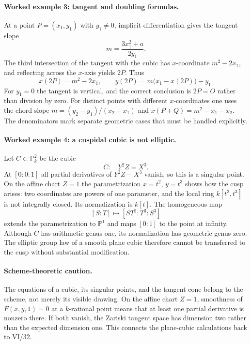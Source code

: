 \paragraph{Worked example 3: tangent and doubling formulas.}
At a point $P=(x_1,y_1)$ with $y_1\ne0$, implicit
differentiation gives the tangent slope
\[
 m=\frac{3x_1^2+a}{2y_1}.
\]
The third intersection of the tangent with the cubic has
$x$-coordinate $m^2-2x_1$, and reflecting across the $x$-axis
yields $2P$.  Thus
\[
 x(2P)=m^2-2x_1,\qquad
 y(2P)=m\bigl(x_1-x(2P)\bigr)-y_1.
\]
For $y_1=0$ the tangent is vertical, and the correct conclusion
is $2P=O$ rather than division by zero.  For distinct points
with different $x$-coordinates one uses the chord slope
$m=(y_2-y_1)/(x_2-x_1)$ and
$x(P+Q)=m^2-x_1-x_2$.  The denominators mark separate
geometric cases that must be handled explicitly.

\paragraph{Worked example 4: a cuspidal cubic is not elliptic.}
Let $C\subset\mathbb P^2_k$ be the cubic
\[
 C:\quad Y^2Z=X^3.
\]
At $[0:0:1]$ all partial derivatives of $Y^2Z-X^3$ vanish,
so this is a singular point.  On the affine chart $Z=1$ the
parametrization $x=t^2$, $y=t^3$ shows how the cusp arises:
two coordinates are powers of one parameter, and the local
ring $k[t^2,t^3]$ is not integrally closed.  Its normalization
is $k[t]$.  The homogeneous map
\[
 [S:T]\longmapsto[ST^2:T^3:S^3]
\]
extends the parametrization to $\mathbb P^1$ and maps
$[0:1]$ to the point at infinity.  Although $C$ has arithmetic
genus one, its normalization has geometric genus zero.  The
elliptic group law of a smooth plane cubic therefore cannot be
transferred to the cusp without substantial modification.

\paragraph{Scheme-theoretic caution.}
The equations of a cubic, its singular points, and the tangent
cone belong to the scheme, not merely its visible drawing.
On the affine chart $Z=1$, smoothness of $F(x,y,1)=0$ at a
$k$-rational point means that at least one partial derivative
is nonzero there.  If both vanish, the Zariski tangent space has
dimension two rather than the expected dimension one.  This
connects the plane-cubic calculations back to VI/32.
